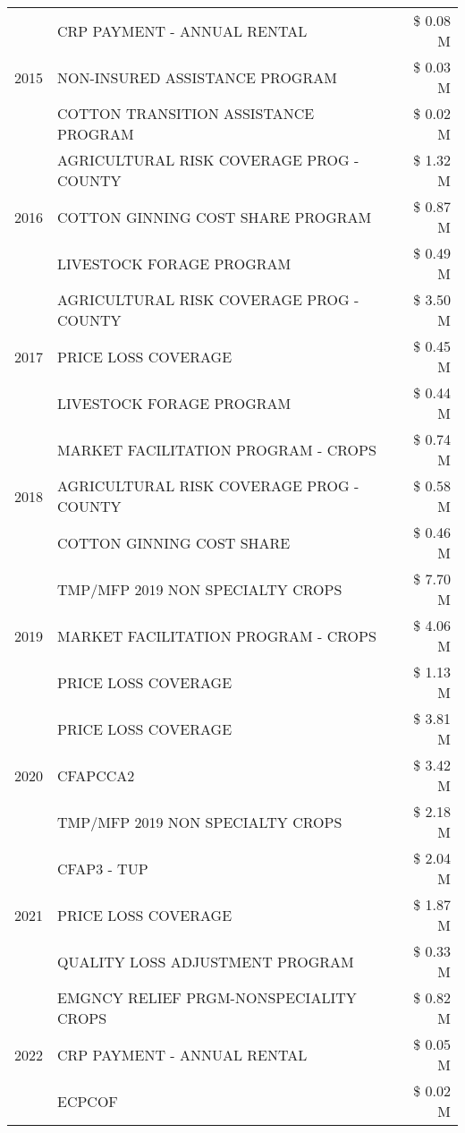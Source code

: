 \begin{tabular}{llr}
\cline{1-3}
\multirow[t]{3}{*}{2015} & CRP PAYMENT - ANNUAL RENTAL & \$ 0.08 M \\
 & NON-INSURED ASSISTANCE PROGRAM & \$ 0.03 M \\
 & COTTON TRANSITION ASSISTANCE PROGRAM & \$ 0.02 M \\
\cline{1-3}
\multirow[t]{3}{*}{2016} & AGRICULTURAL RISK COVERAGE PROG - COUNTY & \$ 1.32 M \\
 & COTTON GINNING COST SHARE PROGRAM & \$ 0.87 M \\
 & LIVESTOCK FORAGE PROGRAM & \$ 0.49 M \\
\cline{1-3}
\multirow[t]{3}{*}{2017} & AGRICULTURAL RISK COVERAGE PROG - COUNTY & \$ 3.50 M \\
 & PRICE LOSS COVERAGE & \$ 0.45 M \\
 & LIVESTOCK FORAGE PROGRAM & \$ 0.44 M \\
\cline{1-3}
\multirow[t]{3}{*}{2018} & MARKET FACILITATION PROGRAM - CROPS & \$ 0.74 M \\
 & AGRICULTURAL RISK COVERAGE PROG - COUNTY & \$ 0.58 M \\
 & COTTON GINNING COST SHARE & \$ 0.46 M \\
\cline{1-3}
\multirow[t]{3}{*}{2019} & TMP/MFP 2019 NON SPECIALTY CROPS & \$ 7.70 M \\
 & MARKET FACILITATION PROGRAM - CROPS & \$ 4.06 M \\
 & PRICE LOSS COVERAGE & \$ 1.13 M \\
\cline{1-3}
\multirow[t]{3}{*}{2020} & PRICE LOSS COVERAGE & \$ 3.81 M \\
 & CFAPCCA2 & \$ 3.42 M \\
 & TMP/MFP 2019 NON SPECIALTY CROPS & \$ 2.18 M \\
\cline{1-3}
\multirow[t]{3}{*}{2021} & CFAP3 - TUP & \$ 2.04 M \\
 & PRICE LOSS COVERAGE & \$ 1.87 M \\
 & QUALITY LOSS ADJUSTMENT PROGRAM & \$ 0.33 M \\
\cline{1-3}
\multirow[t]{3}{*}{2022} & EMGNCY RELIEF PRGM-NONSPECIALITY CROPS & \$ 0.82 M \\
 & CRP PAYMENT - ANNUAL RENTAL & \$ 0.05 M \\
 & ECPCOF & \$ 0.02 M \\
\cline{1-3}
\bottomrule
\end{tabular}
